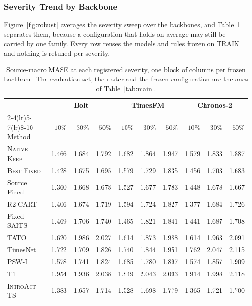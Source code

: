\documentclass{article}
\newcommand{\introact}{\textsc{IntroAct-TS}}
\begin{document}
\subsubsection{Severity Trend by Backbone}
\label{app:robust-fig}
Figure~\ref{fig:robust} averages the severity sweep over the backbones, and
Table~\ref{tab:app-trend} separates them, because a configuration that holds on average may
still be carried by one family. Every row reuses the models and rules frozen on TRAIN and
nothing is retuned per severity.

\begin{table}[htbp]
  \caption{Source-macro MASE at each registered severity, one block of columns per frozen
  backbone. The evaluation set, the roster and the frozen configuration are the ones of
  Table~\ref{tab:main}.}
  \label{tab:app-trend}
  \centering
  \small
  \setlength{\tabcolsep}{4pt}
\begin{tabular*}{\textwidth}{@{\extracolsep{\fill}}lrrrrrrrrr@{}}
    \toprule
     & \multicolumn{3}{c}{Bolt} & \multicolumn{3}{c}{TimesFM} & \multicolumn{3}{c}{Chronos-2} \\
    \cmidrule(lr){2-4}\cmidrule(lr){5-7}\cmidrule(lr){8-10}
    Method & $10\%$ & $30\%$ & $50\%$ & $10\%$ & $30\%$ & $50\%$ & $10\%$ & $30\%$ & $50\%$ \\
    \midrule
    \textsc{Native Keep} & 1.466 & 1.684 & 1.792 & 1.682 & 1.864 & 1.947 & 1.579 & 1.833 & 1.887 \\
    \textsc{Best Fixed} & 1.428 & 1.675 & 1.695 & 1.579 & 1.729 & 1.835 & 1.456 & 1.703 & 1.683 \\
    Source Fixed & 1.360 & 1.668 & 1.678 & 1.527 & 1.677 & 1.783 & 1.448 & 1.678 & 1.667 \\
    R2-CART & 1.406 & 1.674 & 1.719 & 1.594 & 1.724 & 1.827 & 1.377 & 1.684 & 1.726 \\
    Fixed SAITS & 1.469 & 1.706 & 1.740 & 1.465 & 1.821 & 1.841 & 1.441 & 1.687 & 1.708 \\
    TATO & 1.620 & 1.986 & 2.027 & 1.614 & 1.873 & 1.988 & 1.614 & 1.963 & 2.091 \\
    TimesNet & 1.722 & 1.709 & 1.826 & 1.740 & 1.844 & 1.951 & 1.762 & 2.047 & 2.115 \\
    PSW-I & 1.578 & 1.741 & 1.824 & 1.685 & 1.780 & 1.897 & 1.574 & 1.857 & 1.909 \\
    T1 & 1.954 & 1.936 & 2.038 & 1.849 & 2.043 & 2.093 & 1.914 & 1.998 & 2.118 \\
    \midrule
    \introact{} & 1.383 & 1.657 & 1.714 & 1.528 & 1.698 & 1.779 & 1.365 & 1.721 & 1.700 \\
    \bottomrule
  \end{tabular*}
\end{table}
\end{document}
